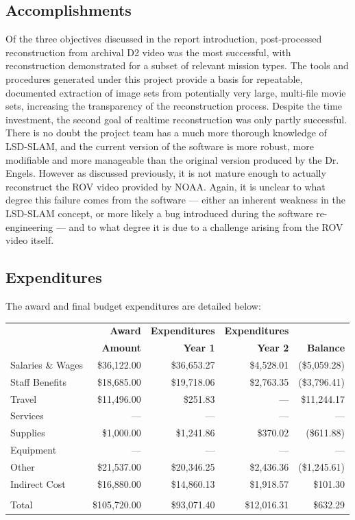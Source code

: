 \documentclass[letterpaper,12pt]{article}
\begin{document}
\subsection{Accomplishments}

Of the three objectives discussed in the report introduction, post-processed reconstruction from archival D2 video was the most successful, with reconstruction demonstrated for a subset of relevant mission types.   The tools and procedures generated under this project provide a basis for repeatable, documented extraction of image sets from potentially very large, multi-file movie sets, increasing the transparency of the reconstruction process.   Despite the time investment, the second goal of realtime reconstruction was only partly successful.   There is no doubt the project team has a much more thorough knowledge of LSD-SLAM, and the current version of the software is more robust, more modifiable and more manageable than the original version produced by the Dr. Engels.  However as discussed previously, it is not mature enough to actually reconstruct the ROV video provided by NOAA.  Again, it is unclear to what degree this failure comes from the software --- either an inherent weakness in the LSD-SLAM concept, or more likely a bug introduced during the software re-engineering --- and to what degree it is due to a challenge arising from the ROV video itself.

\subsection{Expenditures}

The award and final budget expenditures are detailed below:

\begin{tabularx}{0.9\textwidth}{X|rrrr}
    & \textbf{Award} & \textbf{Expenditures} & \textbf{Expenditures} &  \\
    & \textbf{Amount} & \textbf{Year 1} & \textbf{Year 2} & \textbf{Balance} \\
    \hline\hline
    Salaries \& Wages & \$36,122.00 & \$36,653.27 & \$4,528.01 & (\$5,059.28) \\
    Staff Benefits & \$18,685.00 & \$19,718.06 & \$2,763.35 & (\$3,796.41) \\
    Travel & \$11,496.00 & \$251.83 & --- & \$11,244.17 \\
    Services & --- & --- & --- & --- \\
    Supplies & \$1,000.00 & \$1,241.86 & \$370.02 & (\$611.88) \\
    Equipment & --- & --- & --- & --- \\
    Other & \$21,537.00 & \$20,346.25 & \$2,436.36 & (\$1,245.61) \\
    Indirect Cost & \$16,880.00 & \$14,860.13 & \$1,918.57 & \$101.30 \\
     \\
    Total & \$105,720.00 & \$93,071.40 & \$12,016.31 & \$632.29 
\end{tabularx}
\end{document}
